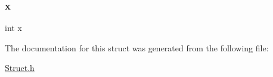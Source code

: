 \mbox{\label{struct_cell_a6150e0515f7202e2fb518f7206ed97dc}} 
\subsubsection{\texorpdfstring{x}{x}}
{\footnotesize\ttfamily int x}



The documentation for this struct was generated from the following file\+:\begin{DoxyCompactItemize}
\item 
\hyperlink{_struct_8h}{Struct.\+h}\end{DoxyCompactItemize}
